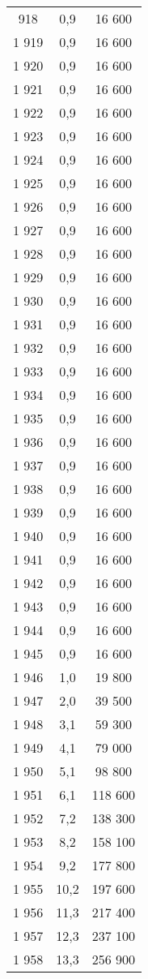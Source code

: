 \documentclass[french,11pt]{book}
\begin{document}
\begin{longtable}[t]{ccc}
\endfoot
\bottomrule
\endlastfoot
1 918 & 0,9 & 16 600\\
1 919 & 0,9 & 16 600\\
1 920 & 0,9 & 16 600\\
1 921 & 0,9 & 16 600\\
1 922 & 0,9 & 16 600\\
1 923 & 0,9 & 16 600\\
1 924 & 0,9 & 16 600\\
1 925 & 0,9 & 16 600\\
1 926 & 0,9 & 16 600\\
1 927 & 0,9 & 16 600\\
1 928 & 0,9 & 16 600\\
1 929 & 0,9 & 16 600\\
1 930 & 0,9 & 16 600\\
1 931 & 0,9 & 16 600\\
1 932 & 0,9 & 16 600\\
1 933 & 0,9 & 16 600\\
1 934 & 0,9 & 16 600\\
1 935 & 0,9 & 16 600\\
1 936 & 0,9 & 16 600\\
1 937 & 0,9 & 16 600\\
1 938 & 0,9 & 16 600\\
1 939 & 0,9 & 16 600\\
1 940 & 0,9 & 16 600\\
1 941 & 0,9 & 16 600\\
1 942 & 0,9 & 16 600\\
1 943 & 0,9 & 16 600\\
1 944 & 0,9 & 16 600\\
1 945 & 0,9 & 16 600\\
1 946 & 1,0 & 19 800\\
1 947 & 2,0 & 39 500\\
1 948 & 3,1 & 59 300\\
1 949 & 4,1 & 79 000\\
1 950 & 5,1 & 98 800\\
1 951 & 6,1 & 118 600\\
1 952 & 7,2 & 138 300\\
1 953 & 8,2 & 158 100\\
1 954 & 9,2 & 177 800\\
1 955 & 10,2 & 197 600\\
1 956 & 11,3 & 217 400\\
1 957 & 12,3 & 237 100\\
1 958 & 13,3 & 256 900\\

\end{longtable}
\end{document}
